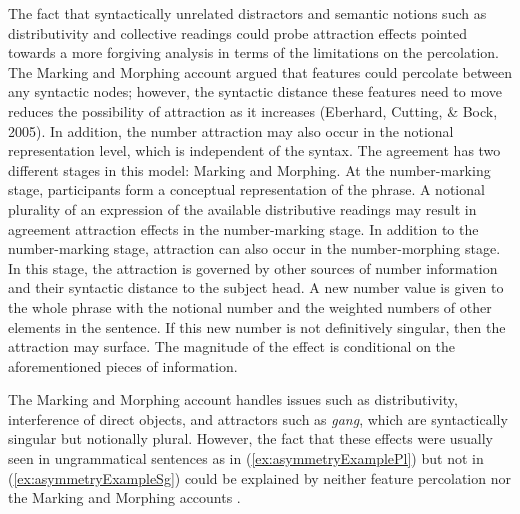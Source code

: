 \ea \label{ex:MMreasons}
  \z
\z

The fact that syntactically unrelated distractors and semantic notions such as distributivity and collective readings could probe attraction effects pointed towards a more forgiving analysis in terms of the limitations on the percolation. The Marking and Morphing account argued that features could percolate between any syntactic nodes; however, the syntactic distance these features need to move reduces the possibility of attraction as it increases (Eberhard, Cutting, \& Bock, 2005). In addition, the number attraction may also occur in the notional representation level, which is independent of the syntax. The agreement has two different stages in this model: Marking and Morphing. At the number-marking stage, participants form a conceptual representation of the phrase. A notional plurality of an expression of the available distributive readings may result in agreement attraction effects in the number-marking stage. In addition to the number-marking stage, attraction can also occur in the number-morphing stage. In this stage, the attraction is governed by other sources of number information and their syntactic distance to the subject head. A new number value is given to the whole phrase with the notional number and the weighted numbers of other elements in the sentence. If this new number is not definitively singular, then the attraction may surface. The magnitude of the effect is conditional on the aforementioned pieces of information.

The Marking and Morphing account handles issues such as distributivity, interference of direct objects, and attractors such as {\it gang}, which are syntactically singular but notionally plural. However, the fact that these effects were usually seen in ungrammatical sentences as in (\ref{ex:asymmetryExamplePl}) but not in (\ref{ex:asymmetryExampleSg}) could be explained by neither feature percolation nor the Marking and Morphing accounts \citep{WagersEtAl:2009}. 

\ea \label{ex:asymmetryExample}
  \z
\z

